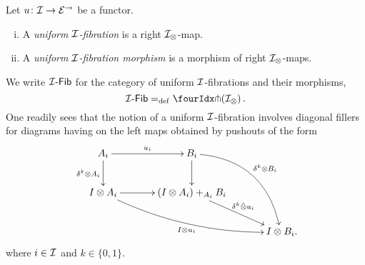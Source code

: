 \documentclass[reqno,10pt,a4paper,oneside,draft]{amsart}
\begin{document}
\begin{definition} \label{def:I-fibration}
Let $u \co \cal{I} \to \catE^\to$ be a functor.
\begin{enumerate}[(i)]
\item A \emph{uniform $\cal{I}$-fibration} is a right $\cal{I}_\otimes$-map.
\item A \emph{uniform $\cal{I}$-fibration morphism} is a morphism of right $\cal{I}_\otimes$-maps.
\end{enumerate}
\end{definition}

We write $\Fib{\cal{I}}$ for the category of uniform $\cal{I}$-fibrations and their morphisms, \ie
\[
  \Fib{\cal{I}} \defeq \liftr{(\cal{I}_\otimes)} \, .
\]
One readily sees that the notion of a uniform $\cal{I}$-fibration involves diagonal fillers for diagrams having on the left maps obtained by pushouts of the form
\begin{gather*}
\xymatrix@C=1.2cm{
  A_i
  \ar[r]^{u_i}
  \ar[d]_{\kcyl \otimes A_i}
&
  B_i
  \ar@/^2pc/[ddr]^{\kcyl \otimes B_i}
  \ar[d]
&\\
  \interval \otimes A_i
  \ar@/_1pc/[drr]_{\interval \otimes u_i}
  \ar[r]
&
  (\interval \otimes A_i) +_{A_i} B_i
  \ar[dr]^-{\delta^k \hatotimes u_i}
&\\&&
  \interval \otimes B_i
\rlap{.}}
\end{gather*}
where $i \in \cal{I}$ and $k \in \{0, 1 \}$.
\end{document}
